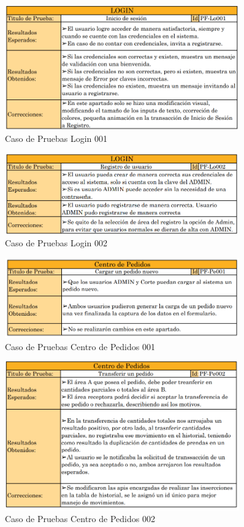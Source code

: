 \documentclass[12pt,letterpaper,spanish]{report}
\begin{document}
\newpage

\begin{figure}[H]
  \centering
  \includegraphics[width=0.9\textwidth]{PF-Lo001.png}
  \caption{Caso de Pruebas Login 001}\label{Lo001}
\end{figure}

\begin{figure}[H]
  \centering
  \includegraphics[width=0.9\textwidth]{PF-Lo002.png}
  \caption{Caso de Pruebas Login 002}\label{Lo002}
\end{figure}


\begin{figure}[H]
  \centering
  \includegraphics[width=0.9\textwidth]{PF-Pe001.png}
  \caption{Caso de Pruebas Centro de Pedidos 001}\label{Pe001}
\end{figure}

\begin{figure}[H]
  \centering
  \includegraphics[width=0.9\textwidth]{PF-Pe002.png}
  \caption{Caso de Pruebas Centro de Pedidos 002}\label{Pe002}
\end{figure}
\end{document}
